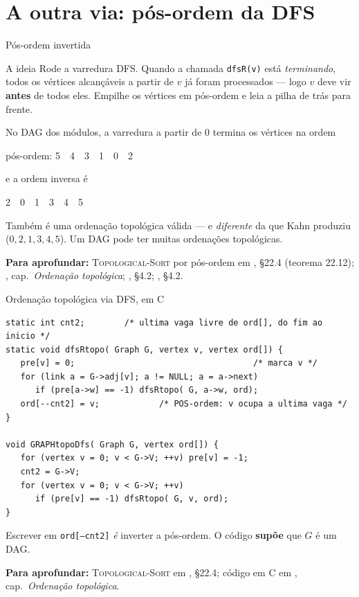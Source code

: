 \documentclass[aspectratio=169]{beamer}
\newcommand{\fonte}[1]{%
  \vfill
  {\tiny\color{gray!55!black}\textbf{Para aprofundar:} #1\par}%
}
\begin{document}
\section{A outra via: pós-ordem da DFS}

\begin{frame}{Pós-ordem invertida}
  \begin{block}{A ideia}
    {\small Rode a varredura DFS. Quando a chamada \texttt{dfsR(v)} está
    \emph{terminando}, todos os vértices alcançáveis a partir de $v$ já foram
    processados --- logo $v$ deve vir \textbf{antes} de todos eles. Empilhe os
    vértices em pós-ordem e leia a pilha de trás para frente.}
  \end{block}
  \medskip
  {\small No DAG dos módulos, a varredura a partir de 0 termina os
  vértices na ordem}
  \begin{center}\ttfamily\small
  pós-ordem: 5\ \ 4\ \ 3\ \ 1\ \ 0\ \ 2
  \end{center}
  {\small e a ordem inversa é}
  \begin{center}\ttfamily\small
  2\ \ 0\ \ 1\ \ 3\ \ 4\ \ 5
  \end{center}
  {\scriptsize Também é uma ordenação topológica válida --- e \emph{diferente}
  da que Kahn produziu ($0,2,1,3,4,5$). Um DAG pode ter muitas ordenações
  topológicas.}
  \fonte{\textsc{Topological-Sort} por pós-ordem em
  \cite{cormen2009introduction}, §22.4 (teorema 22.12); \cite{feofiloff2020algoritmos}, cap.\ \emph{Ordenação topológica};
  \cite{sedgewick2011algorithms}, §4.2; \cite{levitin2012introduction}, §4.2.}
\end{frame}

\begin{frame}[fragile]{Ordenação topológica via DFS, em C}
\begin{lstlisting}
static int cnt2;        /* ultima vaga livre de ord[], do fim ao inicio */
static void dfsRtopo( Graph G, vertex v, vertex ord[]) {
   pre[v] = 0;                                    /* marca v */
   for (link a = G->adj[v]; a != NULL; a = a->next)
      if (pre[a->w] == -1) dfsRtopo( G, a->w, ord);
   ord[--cnt2] = v;            /* POS-ordem: v ocupa a ultima vaga */
}

void GRAPHtopoDfs( Graph G, vertex ord[]) {
   for (vertex v = 0; v < G->V; ++v) pre[v] = -1;
   cnt2 = G->V;
   for (vertex v = 0; v < G->V; ++v)
      if (pre[v] == -1) dfsRtopo( G, v, ord);
}
\end{lstlisting}
  {\scriptsize Escrever em \texttt{ord[--cnt2]} \emph{é} inverter a pós-ordem.
  O código \textbf{supõe} que $G$ é um DAG.}
  \fonte{\textsc{Topological-Sort} em \cite{cormen2009introduction}, §22.4;
  código em C em \cite{feofiloff2020algoritmos}, cap.\ \emph{Ordenação topológica}.}
\end{frame}
\end{document}
